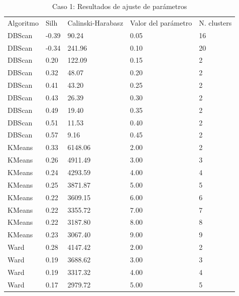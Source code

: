 \documentclass[11pt,a4paper]{article}
\begin{document}
	\begin{table}[]
		\centering
		\caption{Caso 1: Resultados de ajuste de parámetros} \label{tablaComparativa1} 
		\begin{tabular}{lllll}
			Algoritmo & Silh  & Calinski-Harabasz & Valor del parámetro & N. clusters \\
			DBScan    & -0.39 & 90.24             & 0.05       & 16          \\
			DBScan    & -0.34 & 241.96            & 0.10       & 20          \\
			DBScan    & 0.20  & 122.09            & 0.15       & 2           \\
			DBScan    & 0.32  & 48.07             & 0.20       & 2           \\
			DBScan    & 0.41  & 43.20             & 0.25       & 2           \\
			DBScan    & 0.43  & 26.39             & 0.30       & 2           \\
			DBScan    & 0.49  & 19.40             & 0.35       & 2           \\
			DBScan    & 0.51  & 11.53             & 0.40       & 2           \\
			DBScan    & 0.57  & 9.16              & 0.45       & 2           \\
			KMeans    & 0.33  & 6148.06           & 2.00       & 2           \\
			KMeans    & 0.26  & 4911.49           & 3.00       & 3           \\
			KMeans    & 0.24  & 4293.59           & 4.00       & 4           \\
			KMeans    & 0.25  & 3871.87           & 5.00       & 5           \\
			KMeans    & 0.22  & 3609.15           & 6.00       & 6           \\
			KMeans    & 0.22  & 3355.72           & 7.00       & 7           \\
			KMeans    & 0.22  & 3187.80           & 8.00       & 8           \\
			KMeans    & 0.23  & 3067.40           & 9.00       & 9           \\
			Ward      & 0.28  & 4147.42           & 2.00       & 2           \\
			Ward      & 0.19  & 3688.62           & 3.00       & 3           \\
			Ward      & 0.19  & 3317.32           & 4.00       & 4           \\
			Ward      & 0.17  & 2979.72           & 5.00       & 5           \\

\end{tabular}
\end{table}
\end{document}

